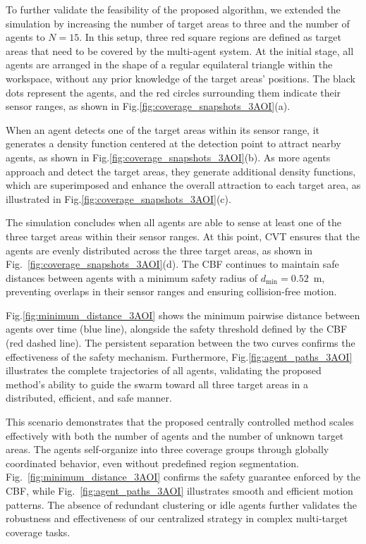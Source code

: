 \documentclass[fleqn,10pt,twocolumn]{main}
\begin{document}
To further validate the feasibility of the proposed algorithm, we extended the simulation by increasing the number of target areas to three and the number of agents to $N=15$. In this setup, three red square regions are defined as target areas that need to be covered by the multi-agent system. At the initial stage, all agents are arranged in the shape of a regular equilateral triangle within the workspace, without any prior knowledge of the target areas’ positions. The black dots represent the agents, and the red circles surrounding them indicate their sensor ranges, as shown in Fig.\ref{fig:coverage_snapshots_3AOI}(a).

When an agent detects one of the target areas within its sensor range, it generates a density function centered at the detection point to attract nearby agents, as shown in Fig.\ref{fig:coverage_snapshots_3AOI}(b). As more agents approach and detect the target areas, they generate additional density functions, which are superimposed and enhance the overall attraction to each target area, as illustrated in Fig.\ref{fig:coverage_snapshots_3AOI}(c).

The simulation concludes when all agents are able to sense at least one of the three target areas within their sensor ranges. At this point, CVT ensures that the agents are evenly distributed across the three target areas, as shown in Fig.~\ref{fig:coverage_snapshots_3AOI}(d). The CBF continues to maintain safe distances between agents with a minimum safety radius of $d_{\min} = 0.52$~m, preventing overlaps in their sensor ranges and ensuring collision-free motion.

Fig.\ref{fig:minimum_distance_3AOI} shows the minimum pairwise distance between agents over time (blue line), alongside the safety threshold defined by the CBF (red dashed line). The persistent separation between the two curves confirms the effectiveness of the safety mechanism. Furthermore, Fig.\ref{fig:agent_paths_3AOI} illustrates the complete trajectories of all agents, validating the proposed method’s ability to guide the swarm toward all three target areas in a distributed, efficient, and safe manner.

This scenario demonstrates that the proposed centrally controlled method scales effectively with both the number of agents and the number of unknown target areas. The agents self-organize into three coverage groups through globally coordinated behavior, even without predefined region segmentation. Fig.~\ref{fig:minimum_distance_3AOI} confirms the safety guarantee enforced by the CBF, while Fig.~\ref{fig:agent_paths_3AOI} illustrates smooth and efficient motion patterns. The absence of redundant clustering or idle agents further validates the robustness and effectiveness of our centralized strategy in complex multi-target coverage tasks.
\end{document}
